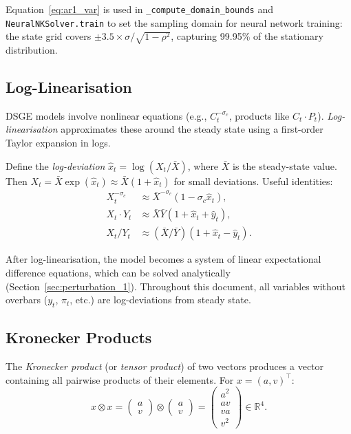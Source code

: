 \documentclass[11pt,a4paper]{article}
\theoremstyle{definition}
\newcommand{\R}{\mathbb{R}}
\newcommand{\code}[1]{\texttt{\color{codecolor}#1}}
\begin{document}
	Equation~\eqref{eq:ar1_var} is used in \code{\_compute\_domain\_bounds} and \code{NeuralNKSolver.train} to set the sampling domain for neural network training: the state grid covers $\pm 3.5 \times \sigma/\sqrt{1 - \rho^2}$, capturing 99.95\% of the stationary distribution.
	
	\subsection{Log-Linearisation}
	\label{sec:loglin}
	
	DSGE models involve nonlinear equations (e.g., $C_t^{-\sigma_c}$, products like $C_t \cdot P_t$).
	\emph{Log-linearisation} approximates these around the steady state using a first-order Taylor expansion in logs.
	
	Define the \emph{log-deviation} $\hat{x}_t = \log(X_t/\bar{X})$, where $\bar{X}$ is the steady-state value.
	Then $X_t = \bar{X} \exp(\hat{x}_t) \approx \bar{X}(1 + \hat{x}_t)$ for small deviations.
	Useful identities:
	\begin{align}
		X_t^{-\sigma_c} &\approx \bar{X}^{-\sigma_c}(1 - \sigma_c \hat{x}_t), \\
		X_t \cdot Y_t &\approx \bar{X}\bar{Y}(1 + \hat{x}_t + \hat{y}_t), \\
		X_t / Y_t &\approx (\bar{X}/\bar{Y})(1 + \hat{x}_t - \hat{y}_t).
	\end{align}
	
	After log-linearisation, the model becomes a system of linear expectational difference equations, which can be solved analytically (Section~\ref{sec:perturbation_1}).
	Throughout this document, all variables without overbars ($y_t$, $\pi_t$, etc.) are log-deviations from steady state.
	
	\subsection{Kronecker Products}
	\label{sec:kronecker}
	
	The \emph{Kronecker product} (or \emph{tensor product}) of two vectors produces a vector containing all pairwise products of their elements.
	For $x = (a, v)^\top$:
	\begin{equation}\label{eq:kron_2d}
		x \otimes x = \begin{pmatrix} a \\ v \end{pmatrix} \otimes \begin{pmatrix} a \\ v \end{pmatrix} = \begin{pmatrix} a^2 \\ av \\ va \\ v^2 \end{pmatrix} \in \R^4.
	\end{equation}
	
\end{document}
